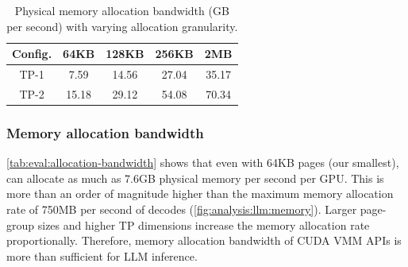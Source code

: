 \begin{table}[t!]
    \centering
    \begin{tabular}{c|c|c|c|c}
      Config. & 64KB & 128KB & 256KB & 2MB \\ \toprule
       TP-1 & 7.59 & 14.56 & 27.04 & 35.17 \\
       TP-2 & 15.18 & 29.12 & 54.08 & 70.34 \\ \bottomrule
    \end{tabular}
    \caption{Physical memory allocation bandwidth (GB per second) with varying allocation granularity.}
    \label{tab:eval:allocation-bandwidth}
\end{table}




\subsubsection{Memory allocation bandwidth} \autoref{tab:eval:allocation-bandwidth} shows that even with 64KB pages (our smallest), \sysname can allocate as much as 7.6GB physical memory per second per GPU. This is more than an order of magnitude higher than the maximum memory allocation rate of 750MB per second of decodes (\autoref{fig:analysis:llm:memory}). Larger page-group sizes and higher TP dimensions increase the memory allocation rate proportionally. Therefore, memory allocation bandwidth of CUDA VMM APIs is more than sufficient for LLM inference.















